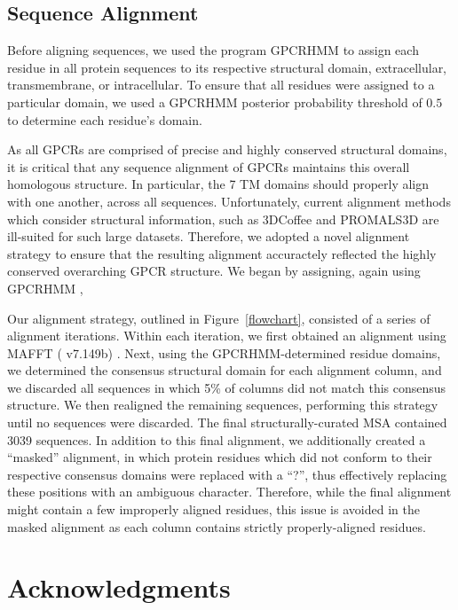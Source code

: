 \documentclass[fleqn,10pt]{wlpeerj}
\begin{document}
\subsection*{Sequence Alignment}
Before aligning sequences, we used the program GPCRHMM \citep{Wistrand2006} to assign each residue in all protein sequences to its respective structural domain, extracellular, transmembrane, or intracellular. To ensure that all residues were assigned to a particular domain, we used a GPCRHMM posterior probability threshold of $0.5$ to determine each residue's domain. 

As all GPCRs are comprised of precise and highly conserved structural domains, it is critical that any sequence alignment of GPCRs maintains this overall homologous structure. In particular, the 7 TM domains should properly align with one another, across all sequences. Unfortunately, current alignment methods which consider structural information, such as 3DCoffee \citep{3dcoffee} and PROMALS3D \citep{promals3d} are ill-suited for such large datasets. Therefore, we adopted a novel alignment strategy to ensure that the resulting alignment accuractely reflected the highly conserved overarching GPCR structure. We began by assigning, again using GPCRHMM \citep{Wistrand2006}, 

Our alignment strategy, outlined in Figure~\ref{flowchart}, consisted of a series of alignment iterations. Within each iteration, we first obtained an alignment using MAFFT ( v7.149b) \cite{mafftv7}. Next, using the GPCRHMM-determined residue domains, we determined the consensus structural domain for each alignment column, and we discarded all sequences in which 5\% of columns did not match this consensus structure. We then realigned the remaining sequences, performing this strategy until no sequences were discarded. The final structurally-curated MSA contained 3039 sequences. In addition to this final alignment, we additionally created a ``masked'' alignment, in which protein residues which did not conform to their respective consensus domains were replaced with a ``?'', thus effectively replacing these positions with an ambiguous character. Therefore, while the final alignment might contain a few improperly aligned residues, this issue is avoided in the masked alignment as each column contains strictly properly-aligned residues.  




\section*{Acknowledgments}
\end{document}
